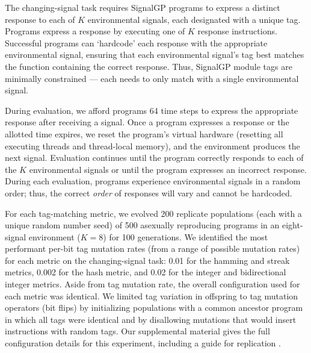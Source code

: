 

The changing-signal task requires SignalGP programs to express a distinct response to each of $K$ environmental signals, each designated with a unique tag.
Programs express a response by executing one of $K$ response instructions.
Successful programs can `hardcode' each response with the appropriate environmental signal, ensuring that each environmental signal's tag best matches the function containing the correct response.
Thus, SignalGP module tags are minimally constrained --- each needs to only match with a single environmental signal.

During evaluation, we afford programs 64 time steps to express the appropriate response after receiving a signal.
Once a program expresses a response or the allotted time expires, we reset the program's virtual hardware (resetting all executing threads and thread-local memory), and the environment produces the next signal.
Evaluation continues until the program correctly responds to each of the $K$ environmental signals or until the program expresses an incorrect response.
During each evaluation, programs experience environmental signals in a random order; thus, the correct \textit{order} of responses will vary and cannot be hardcoded.

For each tag-matching metric, we evolved 200 replicate populations (each with a unique random number seed) of 500 asexually reproducing programs in an eight-signal environment ($K=8$) for 100 generations.
We identified the most performant per-bit tag mutation rates (from a range of possible mutation rates) for each metric on the changing-signal task: 0.01 for the hamming and streak metrics, 0.002 for the hash metric, and 0.02 for the integer and bidirectional integer metrics.
Aside from tag mutation rate, the overall configuration used for each metric was identical.
We limited tag variation in offspring to tag mutation operators (bit flips) by initializing populations with a common ancestor program in which all tags were identical and by disallowing mutations that would insert instructions with random tags.
Our supplemental material gives the full configuration details for this experiment, including a guide for replication \cite{Moreno_Ofria_2020}.

